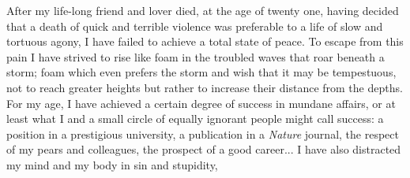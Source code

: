 \documentclass[a4paper, 12pt]{article}
\begin{document}
After my life-long friend and lover died, at the age of twenty one, having
decided that a death of quick and terrible violence was preferable to a life of
slow and tortuous agony, I have failed to achieve a total state of peace. To
escape from this pain I have strived to rise like foam in the troubled waves
that roar beneath a storm; foam which even prefers the storm and wish that it
may be tempestuous, not to reach greater heights but rather to increase their
distance from the depths. For my age, I have achieved a certain degree of
success in mundane affairs, or at least what I and a small circle of equally
ignorant people might call success: a position in a prestigious university,
a publication in a \textit{Nature} journal, the respect of my pears and
colleagues, the prospect of a good career... I have also distracted my mind and
my body in sin and stupidity, 
\end{document}
